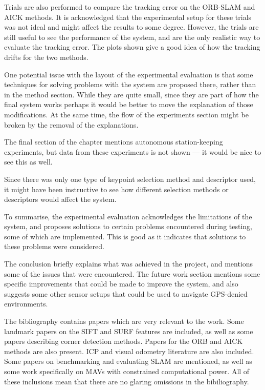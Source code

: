 \documentclass[11pt,a4paper]{article}
\begin{document}
Trials are also performed to compare the tracking error on the ORB-SLAM and AICK
methods. It is acknowledged that the experimental setup for these trials was not
ideal and might affect the results to some degree. However, the trials are still
useful to see the performance of the system, and are the only realistic way to
evaluate the tracking error. The plots shown give a good idea of how the
tracking drifts for the two methods.

One potential issue with the layout of the experimental evaluation is that some
techniques for solving problems with the system are proposed there, rather than
in the method section. While they are quite small, since they are part of how
the final system works perhaps it would be better to move the explanation of
those modifications. At the same time, the flow of the experiments section might
be broken by the removal of the explanations.

The final section of the chapter mentions autonomous station-keeping
experiments, but data from these experiments is not shown --- it would be nice
to see this as well.

Since there was only one type of keypoint selection method and descriptor used,
it might have been instructive to see how different selection methods or
descriptors would affect the system.

To summarise, the experimental evaluation acknowledges the limitations of the
system, and proposes solutions to certain problems encountered during testing,
some of which are implemented. This is good as it indicates that solutions to
these problems were considered.

The conclusion briefly explains what was achieved in the project, and mentions
some of the issues that were encountered. The future work section mentions some
specific improvements that could be made to improve the system, and also
suggests some other sensor setups that could be used to navigate GPS-denied
environments.

The bibliography contains papers which are very relevant to the work. Some
landmark papers on the SIFT and SURF features are included, as well as some
papers describing corner detection methods. Papers for the ORB and AICK methods
are also present. ICP and visual odometry literature are also included. Some
papers on benchmarking and evaluating SLAM are mentioned, as well as some work
specifically on MAVs with constrained computational power. All of these
inclusions mean that there are no glaring omissions in the bibiliography.
\end{document}
